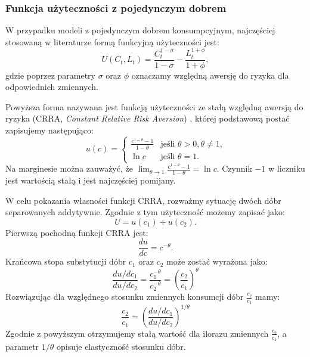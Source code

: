 \subsubsection{Funkcja użyteczności z pojedynczym dobrem}

W przypadku modeli z pojedynczym dobrem konsumpcyjnym, najczęściej stosowaną w literaturze formą funkcyjną użyteczności jest:
\begin{equation}
    U(C_t, L_t) = \frac{C^{1-\sigma}_{t}}{1-\sigma} - \frac{L^{1+\phi}_{t}}{1+\phi},
\end{equation}
gdzie poprzez parametry $\sigma$ oraz $\phi$ oznaczamy względną awersję do ryzyka dla odpowiednich zmiennych.

Powyższa forma nazywana jest funkcją użyteczności ze stałą względną awersją do ryzyka (CRRA, \emph{Constant Relative Risk Aversion}) \cite{isoelastic}, której podstawową postać zapisujemy następująco:
\begin{equation}
    u(c) =
     \begin{cases}
       \frac{c^{1-\theta} - 1}{1-\theta} & \text{jeśli $\theta > 0, \theta \neq 1$,} \\
       \ln c & \text{jeśli $\theta = 1$.} 
     \end{cases}
\end{equation}
Na marginesie można zauważyć, że $\lim_{\theta \to 1} \frac{c^{1-\theta} - 1}{1-\theta} = \ln{c}$. Czynnik $-1$ w liczniku jest wartością stałą i jest najczęściej pomijany.

W celu pokazania własności funkcji CRRA, rozważmy sytuację dwóch dóbr separowanych addytywnie. Zgodnie z tym użyteczność możemy zapisać jako:
\begin{equation}
    U = u(c_1) + u(c_2).
\end{equation}
Pierwszą pochodną funkcji CRRA jest:
\begin{equation}
    \frac{d u}{d c} = c^{-\theta}.
\end{equation}
Krańcowa stopa substytucji dóbr $c_1$ oraz $c_2$ może zostać wyrażona jako:
\begin{equation}
    \frac{d u/d c_1}{d u/d c_2} = \frac{c_1^{-\theta}}{c_2^{-\theta}} = \left(\frac{c_2}{c_1}\right)^\theta
\end{equation}
Rozwiązując dla względnego stosunku zmiennych konsumcji dóbr $\frac{c_2}{c_1}$ mamy:
\begin{equation}
    \frac{c_2}{c_1} = \left(\frac{d u/d c_1}{d u/d c_2}\right)^{1/\theta}
\end{equation}
Zgodnie z powyższym otrzymujemy stałą wartość dla ilorazu zmiennych $\frac{c_2}{c_1}$, a parametr $1/\theta$ opisuje elastyczność stosunku dóbr.

